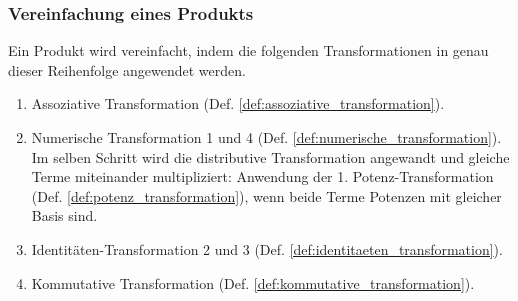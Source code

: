 \documentclass[11pt]{article}
\newcommand{\lab}[1]{(Def. \ref{#1})}
\begin{document}
\subsubsection{Vereinfachung eines Produkts}
Ein Produkt wird vereinfacht, indem die folgenden 
Transformationen in genau dieser Reihenfolge angewendet werden.
\begin{enumerate}
  \item Assoziative Transformation \lab{def:assoziative_transformation}.
  \item Numerische Transformation 1 und 4 \lab{def:numerische_transformation}. 
        Im selben Schritt wird die distributive Transformation angewandt und
        gleiche Terme miteinander multipliziert: Anwendung der 1. Potenz-Transformation
        \lab{def:potenz_transformation}, wenn beide Terme Potenzen mit gleicher Basis sind.
  \item Identitäten-Transformation 2 und 3 \lab{def:identitaeten_transformation}.
  \item Kommutative Transformation \lab{def:kommutative_transformation}.
\end{enumerate}
\end{document}

